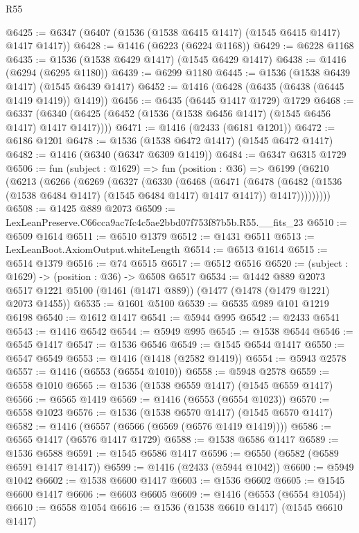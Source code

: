 \begin{lexlean}{R55}
\begin{coremodule}
{{@6425 := @6347 (@6407 (@1536 (@1538 @6415 @1417) (@1545 @6415 @1417) @1417 @1417))
@6428 := @1416 (@6223 (@6224 @1168))
@6429 := @6228 @1168
@6435 := @1536 (@1538 @6429 @1417) (@1545 @6429 @1417)
@6438 := @1416 (@6294 (@6295 @1180))
@6439 := @6299 @1180
@6445 := @1536 (@1538 @6439 @1417) (@1545 @6439 @1417)
@6452 := @1416 (@6428 (@6435 (@6438 (@6445 @1419 @1419)) @1419))
@6456 := @6435 (@6445 @1417 @1729) @1729
@6468 := @6337 (@6340 (@6425 (@6452 (@1536 (@1538 @6456 @1417) (@1545 @6456 @1417) @1417 @1417))))
@6471 := @1416 (@2433 (@6181 @1201))
@6472 := @6186 @1201
@6478 := @1536 (@1538 @6472 @1417) (@1545 @6472 @1417)
@6482 := @1416 (@6340 (@6347 @6309 @1419))
@6484 := @6347 @6315 @1729
@6506 := fun (subject : @1629) =>
  fun (position : @36) =>
  @6199
    (@6210
      (@6213
        (@6266
          (@6269
            (@6327
              (@6330
                (@6468
                  (@6471
                    (@6478
                      (@6482 (@1536 (@1538 @6484 @1417) (@1545 @6484 @1417) @1417 @1417))
                      @1417)))))))))
@6508 := @1425 @889 @2073
@6509 := LexLeanPreserve.C66cca9ac7fc4c5ae2bbd07f753f87b5b.R55.__fits_23
@6510 := @6509 @1614
@6511 := @6510 @1379
@6512 := @1431 @6511
@6513 := LexLeanBoot.AxiomOutput.whiteLength
@6514 := @6513 @1614
@6515 := @6514 @1379
@6516 := @74 @6515
@6517 := @6512 @6516
@6520 := (subject : @1629) -> (position : @36) -> @6508 @6517
@6534 := @1442
    @889
    @2073
    @6517
    @1221
    @5100
    (@1461 (@1471 @889))
    (@1477 (@1478 (@1479 @1221) @2073 @1455))
@6535 := @1601 @5100
@6539 := @6535 @989 @101 @1219 @6198
@6540 := @1612 @1417
@6541 := @5944 @995
@6542 := @2433 @6541
@6543 := @1416 @6542
@6544 := @5949 @995
@6545 := @1538 @6544
@6546 := @6545 @1417
@6547 := @1536 @6546
@6549 := @1545 @6544 @1417
@6550 := @6547 @6549
@6553 := @1416 (@1418 (@2582 @1419))
@6554 := @5943 @2578
@6557 := @1416 (@6553 (@6554 @1010))
@6558 := @5948 @2578
@6559 := @6558 @1010
@6565 := @1536 (@1538 @6559 @1417) (@1545 @6559 @1417)
@6566 := @6565 @1419
@6569 := @1416 (@6553 (@6554 @1023))
@6570 := @6558 @1023
@6576 := @1536 (@1538 @6570 @1417) (@1545 @6570 @1417)
@6582 := @1416 (@6557 (@6566 (@6569 (@6576 @1419 @1419))))
@6586 := @6565 @1417 (@6576 @1417 @1729)
@6588 := @1538 @6586 @1417
@6589 := @1536 @6588
@6591 := @1545 @6586 @1417
@6596 := @6550 (@6582 (@6589 @6591 @1417 @1417))
@6599 := @1416 (@2433 (@5944 @1042))
@6600 := @5949 @1042
@6602 := @1538 @6600 @1417
@6603 := @1536 @6602
@6605 := @1545 @6600 @1417
@6606 := @6603 @6605
@6609 := @1416 (@6553 (@6554 @1054))
@6610 := @6558 @1054
@6616 := @1536 (@1538 @6610 @1417) (@1545 @6610 @1417)
}}
\end{coremodule}
\end{lexlean}
